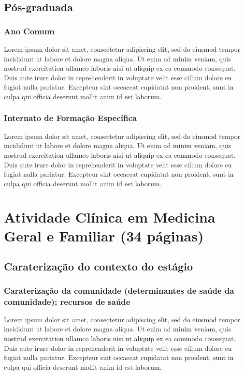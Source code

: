 \documentclass{report}
\begin{document}
\section{Pós-graduada}

\subsection{Ano Comum}
Lorem ipsum dolor sit amet, consectetur adipiscing elit, sed do eiusmod tempor incididunt ut labore et dolore magna aliqua. Ut enim ad minim veniam, quis nostrud exercitation ullamco laboris nisi ut aliquip ex ea commodo consequat. Duis aute irure dolor in reprehenderit in voluptate velit esse cillum dolore eu fugiat nulla pariatur. Excepteur sint occaecat cupidatat non proident, sunt in culpa qui officia deserunt mollit anim id est laborum.

\subsection{Internato de Formação Específica}
Lorem ipsum dolor sit amet, consectetur adipiscing elit, sed do eiusmod tempor incididunt ut labore et dolore magna aliqua. Ut enim ad minim veniam, quis nostrud exercitation ullamco laboris nisi ut aliquip ex ea commodo consequat. Duis aute irure dolor in reprehenderit in voluptate velit esse cillum dolore eu fugiat nulla pariatur. Excepteur sint occaecat cupidatat non proident, sunt in culpa qui officia deserunt mollit anim id est laborum.

\chapter{Atividade Clínica em Medicina Geral e Familiar (34 páginas)}

\section{Caraterização do contexto do estágio}
\subsection{Caraterização da comunidade (determinantes de saúde da comunidade); recursos de saúde}
Lorem ipsum dolor sit amet, consectetur adipiscing elit, sed do eiusmod tempor incididunt ut labore et dolore magna aliqua. Ut enim ad minim veniam, quis nostrud exercitation ullamco laboris nisi ut aliquip ex ea commodo consequat. Duis aute irure dolor in reprehenderit in voluptate velit esse cillum dolore eu fugiat nulla pariatur. Excepteur sint occaecat cupidatat non proident, sunt in culpa qui officia deserunt mollit anim id est laborum.
\end{document}
